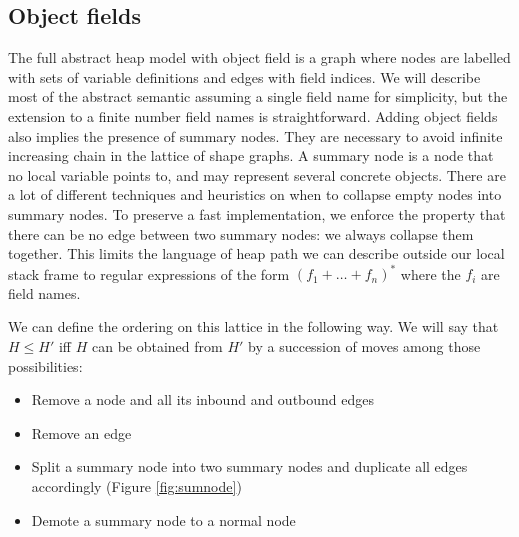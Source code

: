 \documentclass[11pt]{article}
\begin{document}
\subsection*{Object fields}

The full abstract heap model with object field is a graph where nodes are labelled with sets of variable definitions and edges with field indices.
We will describe most of the abstract semantic assuming a single field name for simplicity, but the extension to a finite number field names is straightforward.
Adding object fields also implies the presence of summary nodes. They are necessary to avoid infinite increasing chain in the lattice of shape graphs.
A summary node is a node that no local variable points to, and may represent several concrete objects.
There are a lot of different techniques and heuristics on when to collapse empty nodes into summary nodes.
To preserve a fast implementation, we enforce the property that there can be no edge between two summary nodes: we always collapse them together.
This limits the language of heap path we can describe outside our local stack frame to regular expressions of the form $(f_1+\dots+f_n)^*$ where the $f_i$ are field names.

We can define the ordering on this lattice in the following way.
We will say that $H\leq H'$ iff $H$ can be obtained from $H'$ by a succession of moves among those possibilities:
\begin{itemize}
\item Remove a node and all its inbound and outbound edges
\item Remove an edge
\item Split a summary node into two summary nodes and duplicate all edges accordingly (Figure \ref{fig:sumnode})
\item Demote a summary node to a normal node
\end{itemize}
\end{document}
